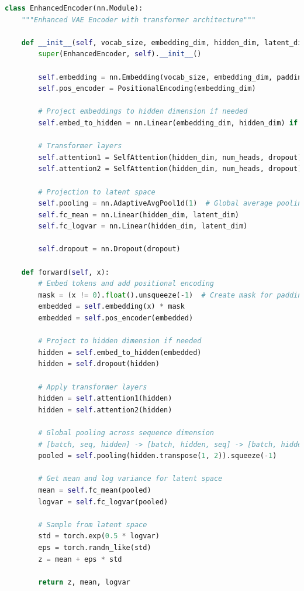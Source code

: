 \documentclass[12pt,openany]{article}
\theoremstyle{definition}
\theoremstyle{definition}
\theoremstyle{definition}
\begin{document}
\begin{lstlisting}[language=Python, caption=Encoder Implementation]
class EnhancedEncoder(nn.Module):
    """Enhanced VAE Encoder with transformer architecture"""

    def __init__(self, vocab_size, embedding_dim, hidden_dim, latent_dim, num_heads=4, dropout=0.1):
        super(EnhancedEncoder, self).__init__()

        self.embedding = nn.Embedding(vocab_size, embedding_dim, padding_idx=0)
        self.pos_encoder = PositionalEncoding(embedding_dim)

        # Project embeddings to hidden dimension if needed
        self.embed_to_hidden = nn.Linear(embedding_dim, hidden_dim) if embedding_dim != hidden_dim else nn.Identity()

        # Transformer layers
        self.attention1 = SelfAttention(hidden_dim, num_heads, dropout)
        self.attention2 = SelfAttention(hidden_dim, num_heads, dropout)

        # Projection to latent space
        self.pooling = nn.AdaptiveAvgPool1d(1)  # Global average pooling
        self.fc_mean = nn.Linear(hidden_dim, latent_dim)
        self.fc_logvar = nn.Linear(hidden_dim, latent_dim)

        self.dropout = nn.Dropout(dropout)

    def forward(self, x):
        # Embed tokens and add positional encoding
        mask = (x != 0).float().unsqueeze(-1)  # Create mask for padding
        embedded = self.embedding(x) * mask
        embedded = self.pos_encoder(embedded)

        # Project to hidden dimension if needed
        hidden = self.embed_to_hidden(embedded)
        hidden = self.dropout(hidden)

        # Apply transformer layers
        hidden = self.attention1(hidden)
        hidden = self.attention2(hidden)

        # Global pooling across sequence dimension
        # [batch, seq, hidden] -> [batch, hidden, seq] -> [batch, hidden, 1] -> [batch, hidden]
        pooled = self.pooling(hidden.transpose(1, 2)).squeeze(-1)

        # Get mean and log variance for latent space
        mean = self.fc_mean(pooled)
        logvar = self.fc_logvar(pooled)

        # Sample from latent space
        std = torch.exp(0.5 * logvar)
        eps = torch.randn_like(std)
        z = mean + eps * std

        return z, mean, logvar
\end{lstlisting}
\clearpage

\printbibliography
\end{document}
